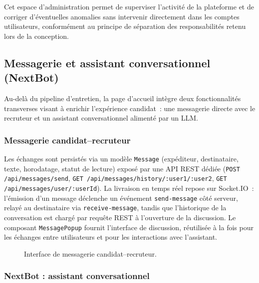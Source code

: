 Cet espace d'administration permet de superviser l'activité de la plateforme et de
corriger d'éventuelles anomalies sans intervenir directement dans les comptes utilisateurs,
conformément au principe de séparation des responsabilités retenu lors de la conception.

\subsection{Messagerie et assistant conversationnel (NextBot)}

Au-delà du pipeline d'entretien, la page d'accueil intègre deux fonctionnalités
transverses visant à enrichir l'expérience candidat~: une messagerie directe avec le
recruteur et un assistant conversationnel alimenté par un LLM.

\subsubsection{Messagerie candidat--recruteur}

Les échanges sont persistés via un modèle \texttt{Message} (expéditeur, destinataire,
texte, horodatage, statut de lecture) exposé par une API REST dédiée
(\texttt{POST /api/\allowbreak messages/\allowbreak send}, \texttt{GET /api/\allowbreak messages/\allowbreak history/\allowbreak :user1/\allowbreak :user2},
\texttt{GET /api/\allowbreak messages/\allowbreak user/\allowbreak :userId}). La livraison en temps réel repose sur Socket.IO~:
l'émission d'un message déclenche un événement \texttt{send-message} côté serveur, relayé
au destinataire via \texttt{receive-message}, tandis que l'historique de la conversation est
chargé par requête REST à l'ouverture de la discussion. Le composant \texttt{MessagePopup}
fournit l'interface de discussion, réutilisée à la fois pour les échanges entre utilisateurs
et pour les interactions avec l'assistant.

\begin{figure}[H]
  \centering
  \caption{Interface de messagerie candidat--recruteur.}
  \label{fig:messaging}
\end{figure}

\subsubsection{NextBot : assistant conversationnel}

